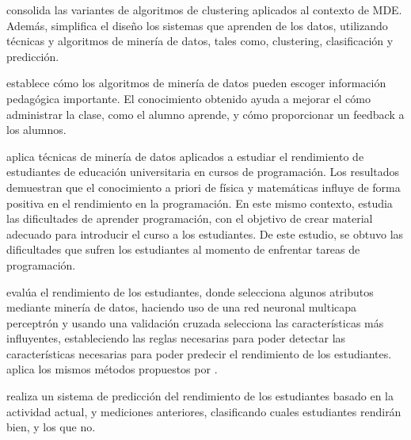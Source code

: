 \textcite{dutt2015clustering} consolida las variantes de algoritmos de clustering aplicados al contexto de MDE. Además, simplifica el diseño los sistemas que aprenden de los datos, utilizando técnicas y algoritmos de minería de datos, tales como, clustering, clasificación y predicción.

\textcite{merceron2005educational} establece cómo los algoritmos de minería de datos pueden escoger información pedagógica importante. El conocimiento obtenido ayuda a mejorar el cómo administrar la clase, como el alumno aprende, y cómo proporcionar un feedback a los alumnos. 

\textcite{akinola2012data} aplica técnicas de minería de datos aplicados a estudiar el rendimiento de estudiantes de educación universitaria en cursos de programación. Los resultados demuestran que el conocimiento a priori de física y matemáticas influye de forma positiva en el rendimiento en la programación. En este mismo contexto, \textcite{lahtinen2005study} estudia las dificultades de aprender programación, con el objetivo de crear material adecuado para introducir el curso a los estudiantes. De este estudio, se obtuvo las dificultades que sufren los estudiantes al momento de enfrentar tareas de programación.

\textcite{borkar2014attributes} evalúa el rendimiento de los estudiantes, donde selecciona algunos atributos mediante minería de datos, haciendo uso de una red neuronal multicapa perceptrón y usando una validación cruzada selecciona las características más influyentes, estableciendo las reglas necesarias para poder detectar las características necesarias para poder predecir el rendimiento de los estudiantes. \textcite{jayakameswaraiah2014study} aplica los mismos métodos propuestos por \textcite{borkar2014attributes}.

\textcite{abdullah2014students} realiza un sistema de predicción del rendimiento de los estudiantes basado en la actividad actual, y mediciones anteriores, clasificando cuales estudiantes rendirán bien, y los que no. 


